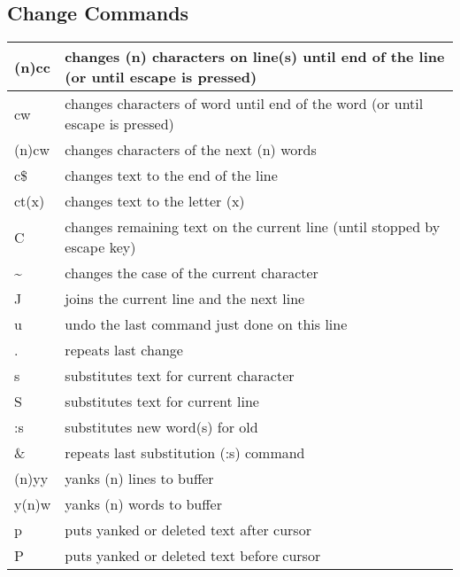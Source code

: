 \documentclass[letterpaper,10pt,english]{sphinxmanual}
\begin{document}
\subsection{Change Commands}
\label{editor/vi:change-commands}
\begin{tabulary}{\linewidth}{|L|L|}
\hline

(n)cc
 & 
changes (n) characters on line(s) until end of the line (or until escape is pressed)
\\
\hline
cw
 & 
changes characters of word until end of the word (or until escape is pressed)
\\
\hline
(n)cw
 & 
changes characters of the next (n) words
\\
\hline
c\$
 & 
changes text to the end of the line
\\
\hline
ct(x)
 & 
changes text to the letter (x)
\\
\hline
C
 & 
changes remaining text on the current line (until stopped by escape key)
\\
\hline
\textasciitilde{}
 & 
changes the case of the current character
\\
\hline
J
 & 
joins the current line and the next line
\\
\hline
u
 & 
undo the last command just done on this line
\\
\hline
.
 & 
repeats last change
\\
\hline
s
 & 
substitutes text for current character
\\
\hline
S
 & 
substitutes text for current line
\\
\hline
:s
 & 
substitutes new word(s) for old
\\
\hline
\&
 & 
repeats last substitution (:s) command
\\
\hline
(n)yy
 & 
yanks (n) lines to buffer
\\
\hline
y(n)w
 & 
yanks (n) words to buffer
\\
\hline
p
 & 
puts yanked or deleted text after cursor
\\
\hline
P
 & 
puts yanked or deleted text before cursor
\\
\hline\end{tabulary}
\end{document}

